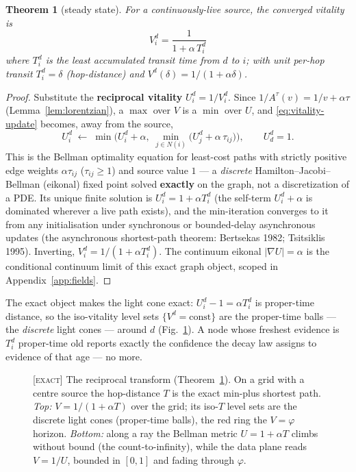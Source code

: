 \documentclass[11pt]{article}
\theoremstyle{plain}
\newtheorem{theorem}{Theorem}[section]
\numberwithin{equation}{section}
\begin{document}
\begin{theorem}[steady state]\label{thm:steadystate}
For a continuously-live source, the converged vitality is
\[
\boxed{\;V^d_i=\frac{1}{1+\alpha\,T^d_i}\;}
\]
where $T^d_i$ is the least accumulated transit time from $d$ to $i$; with unit per-hop transit $T^d_i=\delta$ (hop-distance) and $V^d(\delta)=1/(1+\alpha\delta)$.
\end{theorem}
\begin{proof}
Substitute the \textbf{reciprocal vitality} $U^d_i=1/V^d_i$. Since $1/A^{\tau}(v)=1/v+\alpha\tau$ (Lemma~\ref{lem:lorentzian}), a $\max$ over $V$ is a $\min$ over $U$, and \eqref{eq:vitality-update} becomes, away from the source,
\begin{equation}\label{eq:eikonal}
U^d_i\;\longleftarrow\;\min\!\Big(U^d_i+\alpha,\;\min_{j\in N(i)}\big(U^d_j+\alpha\,\tau_{ij}\big)\Big),\qquad U^d_d=1.
\end{equation}
This is the Bellman optimality equation for least-cost paths with strictly positive edge weights $\alpha\tau_{ij}$ ($\tau_{ij}\ge 1$) and source value $1$ — a \emph{discrete} Hamilton–Jacobi–Bellman (eikonal) fixed point solved \textbf{exactly} on the graph, not a discretization of a PDE. Its unique finite solution is $U^d_i=1+\alpha T^d_i$ (the self-term $U^d_i+\alpha$ is dominated wherever a live path exists), and the min-iteration converges to it from any initialisation under synchronous or bounded-delay asynchronous updates (the asynchronous shortest-path theorem: Bertsekas 1982; Tsitsiklis 1995). Inverting, $V^d_i=1/(1+\alpha T^d_i)$. The continuum eikonal $|\nabla U|=\alpha$ is the conditional continuum limit of this exact graph object, scoped in Appendix~\ref{app:fields}.
\end{proof}

The exact object makes the light cone exact: $U^d_i-1=\alpha T^d_i$ is proper-time distance, so the iso-vitality level sets $\{V^d=\text{const}\}$ are the proper-time balls — the \emph{discrete} light cones — around $d$ (Fig.~\ref{fig:reciprocal}). A node whose freshest evidence is $T^d_i$ proper-time old reports exactly the confidence the decay law assigns to evidence of that age — no more.

\begin{figure}[tbp]
\centering

\caption{\textsc{[exact]} The reciprocal transform (Theorem~\ref{thm:steadystate}). On a grid with a centre source the hop-distance $T$ is the exact min-plus shortest path. \emph{Top:} $V=1/(1+\alpha T)$ over the grid; its iso-$T$ level sets are the discrete light cones (proper-time balls), the red ring the $V=\varphi$ horizon. \emph{Bottom:} along a ray the Bellman metric $U=1+\alpha T$ climbs without bound (the count-to-infinity), while the data plane reads $V=1/U$, bounded in $[0,1]$ and fading through $\varphi$.}
\label{fig:reciprocal}
\end{figure}
\end{document}
